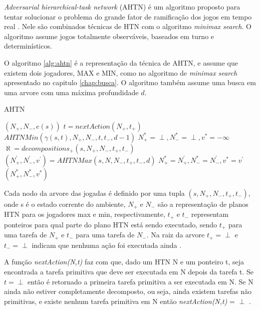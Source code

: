 \textit{Adversarial hierarchical-task network} (AHTN) é um algoritmo proposto para tentar solucionar o problema do grande fator de ramificação dos jogos em tempo real \cite{ontanon2015adversarial}. Nele são combinados técnicas de HTN com o algoritmo \textit{minimax search}. O algoritmo assume jogos totalmente observáveis, baseados em turno e determinísticos.

O algoritmo \ref{alg:ahtn} \cite{ontanon2015adversarial} é a representação da técnica de AHTN, e assume que existem dois jogadores, MAX e MIN, como no algoritmo de \textit{minimax search} apresentado no capitulo \ref{chap:busca}. O algoritmo também assume uma busca em uma arvore com uma máxima profundidade $d$.

\begin{algorithm}
	\caption{AHTN}
	\label{alg:ahtn}
	\begin{algorithmic}[1]		
		\State	\Return $(N_{+}, N_{-}, e(s))$
		\EndIf
		\State $t = nextAction(N_{+}, t_{+})$ 
		\State \Return $AHTNMin(\gamma(s,t), N_{+}, N_{-}, t, t_{-}, d-1)$
		\EndIf
		\State $N_{+}^{*} = \perp, N_{-}^{*} = \perp, v^{*} = -\infty$
		\State $\aleph = decompositions_{+}(s, N_{+}, N_{-}, t_{+}, t_{-})$
		\State $(N^{'}_{+}, N^{'}_{-}, v^{'}) = AHTNMax(s, N, N_{-}, t_{+}, t_{-}, d)$
		\State $N_{+}^{*} = N^{'}_{+}, N_{-}^{*} = N^{'}_{-}, v^{*} = v^{'} $
		\EndIf
		\EndFor		
		\State \Return $(N_{+}^{*}, N_{-}^{*}, v^{*} )$
		\EndFunction
	\end{algorithmic}
\end{algorithm}

Cada nodo da arvore das jogadas é definido por uma tupla $(s, N_{+}, N_{-}, t_{+}, t_{-})$, onde s é o estado corrente do ambiente, $N_{+}$ e $N_{-}$ são a representação de planos HTN para os jogadores max e min, respectivamente, $t_{+}$ e $t_{-}$ representam ponteiros para qual parte do plano HTN está sendo executado, sendo  $t_{+}$ para uma tarefa de $N_{+}$ e $t_{-}$ para uma tarefa de $N_{-}$. Na raiz da arvore $t_{+} = \perp$ e $t_{-} = \perp$ indicam que nenhuma ação foi executada ainda \cite{ontanon2015adversarial}.

A função \textit{nextAction(N,t)} faz com que, dado um HTN N e um ponteiro t, seja encontrada a tarefa primitiva que deve ser executada em N depois da tarefa t. Se $t = \perp$ então é retornado a primeira tarefa primitiva a ser executada em N. Se N ainda não estiver completamente decomposto, ou seja, ainda existem tarefas não primitivas, e existe nenhum tarefa primitiva em N então \textit{nextAction(N,t)} = $\perp$ \cite{ontanon2015adversarial}.

